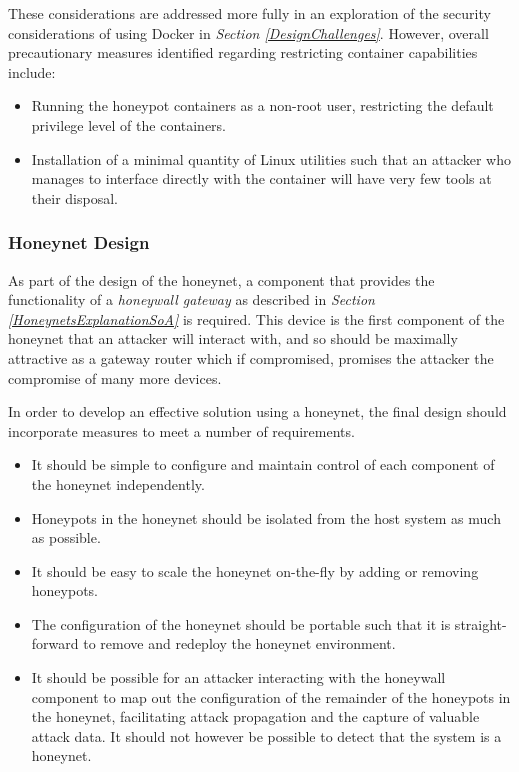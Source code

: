         These considerations are addressed more fully in an exploration of the security considerations of using Docker in \textit{Section \ref{DesignChallenges}}. However, overall precautionary measures identified regarding restricting container capabilities include:
        
        \begin{itemize}
        \item Running the honeypot containers as a non-root user, restricting the default privilege level of the containers.
        \item Installation of a minimal quantity of Linux utilities such that an attacker who manages to interface directly with the container will have very few tools at their disposal.
        \end{itemize}
		
        
\subsubsection{Honeynet Design}

As part of the design of the honeynet, a component that provides the functionality of a \textit{honeywall gateway} as described in \textit{Section \ref{HoneynetsExplanationSoA}} is required. This device is the first component of the honeynet that an attacker will interact with, and so should be maximally attractive as a gateway router which if compromised, promises the attacker the compromise of many more devices. %

In order to develop an effective solution using a honeynet, the final design should incorporate measures to meet a number of requirements.

\begin{itemize}
\item It should be simple to configure and maintain control of each component of the honeynet independently.
\item Honeypots in the honeynet should be isolated from the host system as much as possible.
\item It should be easy to scale the honeynet on-the-fly by adding or removing honeypots.
\item The configuration of the honeynet should be portable such that it is straight-forward to remove and redeploy the honeynet environment.
\item It should be possible for an attacker interacting with the honeywall component to map out the configuration of the remainder of the honeypots in the honeynet, facilitating attack propagation and the capture of valuable attack data. It should not however be possible to detect that the system is a honeynet.
\end{itemize}

